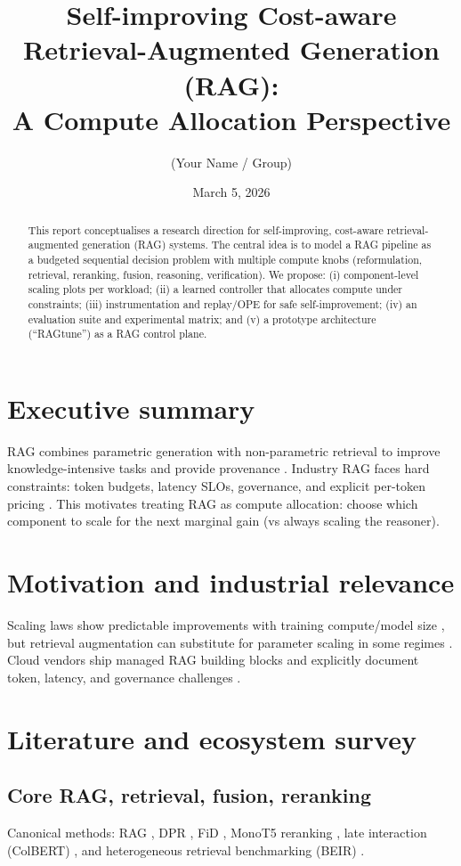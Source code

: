 \documentclass[11pt,a4paper]{article}
\title{Self-improving Cost-aware Retrieval-Augmented Generation (RAG):\\
A Compute Allocation Perspective}
\author{(Your Name / Group)}
\date{March 5, 2026}
\begin{document}
\maketitle

\begin{abstract}
This report conceptualises a research direction for self-improving, cost-aware
retrieval-augmented generation (RAG) systems. The central idea is to model a RAG
pipeline as a budgeted sequential decision problem with multiple compute knobs
(reformulation, retrieval, reranking, fusion, reasoning, verification). We propose:
(i) component-level scaling plots per workload; (ii) a learned controller that
allocates compute under constraints; (iii) instrumentation and replay/OPE for safe
self-improvement; (iv) an evaluation suite and experimental matrix; and (v) a
prototype architecture (“RAGtune”) as a RAG control plane.
\end{abstract}

\section{Executive summary}
RAG combines parametric generation with non-parametric retrieval to improve
knowledge-intensive tasks and provide provenance \cite{Lewis2020RAG}.
Industry RAG faces hard constraints: token budgets, latency SLOs, governance,
and explicit per-token pricing \cite{AzureAISearchRAG2026,AWSBedrockPricing,VertexGenAIPricing}.
This motivates treating RAG as compute allocation: choose which component to
scale for the next marginal gain (vs always scaling the reasoner).

\section{Motivation and industrial relevance}
Scaling laws show predictable improvements with training compute/model size
\cite{Kaplan2020Scaling,Hoffmann2022Chinchilla}, but retrieval augmentation can
substitute for parameter scaling in some regimes \cite{Borgeaud2022RETRO}.
Cloud vendors ship managed RAG building blocks and explicitly document token,
latency, and governance challenges \cite{AWSBedrockKB,VertexRAGOverview,AzureAISearchRAG2026}.

\section{Literature and ecosystem survey}
\subsection{Core RAG, retrieval, fusion, reranking}
Canonical methods: RAG \cite{Lewis2020RAG}, DPR \cite{Karpukhin2020DPR},
FiD \cite{Izacard2021FiD}, MonoT5 reranking \cite{Nogueira2020MonoT5},
late interaction (ColBERT) \cite{Khattab2020ColBERT}, and heterogeneous retrieval
benchmarking (BEIR) \cite{Thakur2021BEIR}.
\end{document}
